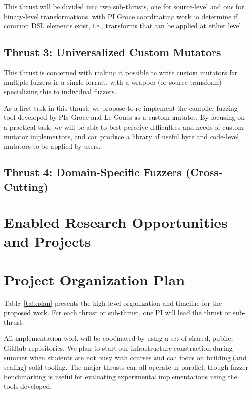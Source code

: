\documentclass[numbers]{proposalnsf}
\begin{document}
This thrust will be divided into two sub-thrusts, one for source-level and one for binary-level transformations, with PI Groce coordinating work to determine if common DSL elements exist, i.e., transforms that can be applied at either level.

\subsection{Thrust 3: Universalized Custom Mutators}

This thrust is concerned with making it possible to write custom mutators for multiple fuzzers in a single format, with a wrapper (or source transform) specializing this to individual fuzzers.

As a first task in this thrust, we propose to re-implement the compiler-fuzzing tool developed by PIs Groce and Le Goues as a custom mutator.  By focusing on a practical task, we will be able to best perceive difficulties and needs of custom mutator implementors, and can produce a library of useful byte and code-level mutators to be applied by users.

\subsection{Thrust 4:  Domain-Specific Fuzzers (Cross-Cutting)}

\section{Enabled Research Opportunities and Projects}

\section{Project Organization Plan}

%
\label{sec:plan}


Table~\ref{tab:plan} presents the high-level organization and timeline for the proposed
work. For each thrust or sub-thrust, one PI will lead the thrust or sub-thrust.


All implementation work will be coodinated by using a set of shared, public, GitHub repositories.    We plan to start our
infrastructure construction during summer when students are
not busy with courses and can focus on
building (and scaling) solid tooling.  The major thrusts can all operate in parallel, though fuzzer benchmarking is useful for evaluating experimental implementations using the tools developed.
\end{document}
